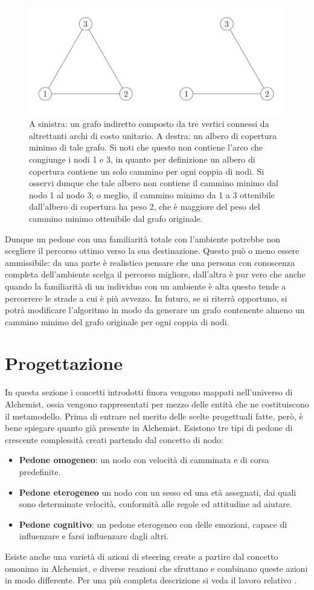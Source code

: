 \documentclass[12pt,a4paper,openright,oneside]{book}
\begin{document}
\begin{figure}
	\centering
    \includegraphics[width=0.7\linewidth]{figures/mst.png}
	\caption{A sinistra: un grafo indiretto composto da tre vertici connessi da altrettanti archi di costo unitario. A destra: un albero di copertura minimo di tale grafo. Si noti che questo non contiene l'arco che congiunge i nodi 1 e 3, in quanto per definizione un albero di copertura contiene un solo cammino per ogni coppia di nodi. Si osservi dunque che tale albero non contiene il cammino minimo dal nodo 1 al nodo 3; o meglio, il cammino minimo da 1 a 3 ottenibile dall'albero di copertura ha peso 2, che è maggiore del peso del cammino minimo ottenibile dal grafo originale.}
	\label{fig:mst-shortest-path}
\end{figure} 
Dunque un pedone con una familiarità totale con l'ambiente potrebbe non scegliere il percorso ottimo verso la sua destinazione. Questo può o meno essere ammissibile: da una parte è realistico pensare che una persona con conoscenza completa dell'ambiente scelga il percorso migliore, dall'altra è pur vero che anche quando la familiarità di un individuo con un ambiente è alta questo tende a percorrere le strade a cui è più avvezzo. In futuro, se si riterrà opportuno, si potrà modificare l'algoritmo in modo da generare un grafo contenente almeno un cammino minimo del grafo originale per ogni coppia di nodi.

\section{Progettazione}
In questa sezione i concetti introdotti finora vengono mappati nell'universo di Alchemist, ossia vengono rappresentati per mezzo delle entità che ne costituiscono il metamodello. Prima di entrare nel merito delle scelte progettuali fatte, però, è bene spiegare quanto già presente in Alchemist. Esistono tre tipi di pedone di crescente complessità creati partendo dal concetto di nodo:
\begin{itemize}
    \item \textbf{Pedone omogeneo}: un nodo con velocità di camminata e di corsa predefinite.
    \item \textbf{Pedone eterogeneo} un nodo con un sesso ed una età assegnati, dai quali sono determinate velocità, conformità alle regole ed attitudine ad aiutare.
    \item \textbf{Pedone cognitivo}: un pedone eterogeneo con delle emozioni, capace di influenzare e farsi influenzare dagli altri.
\end{itemize}
Esiste anche una varietà di azioni di steering create a partire dal concetto omonimo in Alchemist, e diverse reazioni che sfruttano e combinano queste azioni in modo differente. Per una più completa descrizione si veda il lavoro relativo \cite{MazzieriThesis}. 
\end{document}

